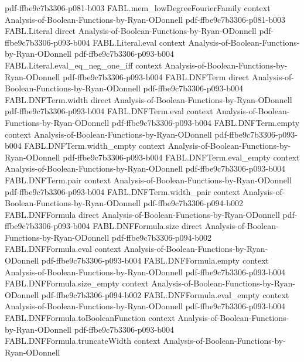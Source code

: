 \begin{theorem}
  {pdf-ffbe9c7b3306-p081-b003}
\proofstep
  {FABL.mem_lowDegreeFourierFamily}
  {context}
  {Analysis-of-Boolean-Functions-by-Ryan-ODonnell}
  {pdf-ffbe9c7b3306-p081-b003}
\proofstep
  {FABL.Literal}
  {direct}
  {Analysis-of-Boolean-Functions-by-Ryan-ODonnell}
  {pdf-ffbe9c7b3306-p093-b004}
\proofstep
  {FABL.Literal.eval}
  {context}
  {Analysis-of-Boolean-Functions-by-Ryan-ODonnell}
  {pdf-ffbe9c7b3306-p093-b004}
\proofstep
  {FABL.Literal.eval_eq_neg_one_iff}
  {context}
  {Analysis-of-Boolean-Functions-by-Ryan-ODonnell}
  {pdf-ffbe9c7b3306-p093-b004}
\proofstep
  {FABL.DNFTerm}
  {direct}
  {Analysis-of-Boolean-Functions-by-Ryan-ODonnell}
  {pdf-ffbe9c7b3306-p093-b004}
\proofstep
  {FABL.DNFTerm.width}
  {direct}
  {Analysis-of-Boolean-Functions-by-Ryan-ODonnell}
  {pdf-ffbe9c7b3306-p093-b004}
\proofstep
  {FABL.DNFTerm.eval}
  {context}
  {Analysis-of-Boolean-Functions-by-Ryan-ODonnell}
  {pdf-ffbe9c7b3306-p093-b004}
\proofstep
  {FABL.DNFTerm.empty}
  {context}
  {Analysis-of-Boolean-Functions-by-Ryan-ODonnell}
  {pdf-ffbe9c7b3306-p093-b004}
\proofstep
  {FABL.DNFTerm.width_empty}
  {context}
  {Analysis-of-Boolean-Functions-by-Ryan-ODonnell}
  {pdf-ffbe9c7b3306-p093-b004}
\proofstep
  {FABL.DNFTerm.eval_empty}
  {context}
  {Analysis-of-Boolean-Functions-by-Ryan-ODonnell}
  {pdf-ffbe9c7b3306-p093-b004}
\proofstep
  {FABL.DNFTerm.pair}
  {context}
  {Analysis-of-Boolean-Functions-by-Ryan-ODonnell}
  {pdf-ffbe9c7b3306-p093-b004}
\proofstep
  {FABL.DNFTerm.width_pair}
  {context}
  {Analysis-of-Boolean-Functions-by-Ryan-ODonnell}
  {pdf-ffbe9c7b3306-p094-b002}
\proofstep
  {FABL.DNFFormula}
  {direct}
  {Analysis-of-Boolean-Functions-by-Ryan-ODonnell}
  {pdf-ffbe9c7b3306-p093-b004}
\proofstep
  {FABL.DNFFormula.size}
  {direct}
  {Analysis-of-Boolean-Functions-by-Ryan-ODonnell}
  {pdf-ffbe9c7b3306-p094-b002}
\proofstep
  {FABL.DNFFormula.eval}
  {context}
  {Analysis-of-Boolean-Functions-by-Ryan-ODonnell}
  {pdf-ffbe9c7b3306-p093-b004}
\proofstep
  {FABL.DNFFormula.empty}
  {context}
  {Analysis-of-Boolean-Functions-by-Ryan-ODonnell}
  {pdf-ffbe9c7b3306-p093-b004}
\proofstep
  {FABL.DNFFormula.size_empty}
  {context}
  {Analysis-of-Boolean-Functions-by-Ryan-ODonnell}
  {pdf-ffbe9c7b3306-p094-b002}
\proofstep
  {FABL.DNFFormula.eval_empty}
  {context}
  {Analysis-of-Boolean-Functions-by-Ryan-ODonnell}
  {pdf-ffbe9c7b3306-p093-b004}
\proofstep
  {FABL.DNFFormula.toBooleanFunction}
  {context}
  {Analysis-of-Boolean-Functions-by-Ryan-ODonnell}
  {pdf-ffbe9c7b3306-p093-b004}
\proofstep
  {FABL.DNFFormula.truncateWidth}
  {context}
  {Analysis-of-Boolean-Functions-by-Ryan-ODonnell}

\end{theorem}
